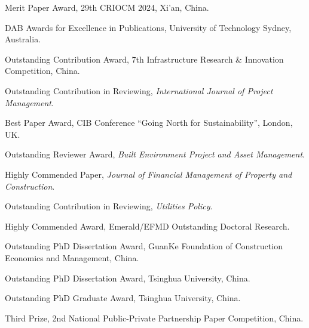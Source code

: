 \documentclass[11pt,a4paper]{report} %
\begin{document}
    \begin{tablist}

        \item[2024] \tab{}Merit Paper Award, 29th CRIOCM 2024, Xi'an, China.
        
        \item[2020] \tab{}DAB Awards for Excellence in Publications, University of Technology Sydney, Australia.
        
        \item[2020] \tab{}Outstanding Contribution Award, 7th Infrastructure Research \& Innovation Competition, China.
        
        \item[2016] \tab{}Outstanding Contribution in Reviewing, \textit{International Journal of Project Management}.
        
        \item[2015] \tab{}Best Paper Award, CIB Conference “Going North for Sustainability”, London, UK.
        
        \item[2015] \tab{}Outstanding Reviewer Award, \textit{Built Environment Project and Asset Management}.
        
        \item[2014] \tab{}Highly Commended Paper, \textit{Journal of Financial Management of Property and Construction}.
        
        \item[2014] \tab{}Outstanding Contribution in Reviewing, \textit{Utilities Policy}.
        
        \item[2010] \tab{}Highly Commended Award, Emerald/EFMD Outstanding Doctoral Research.
        
        \item[2010] \tab{}Outstanding PhD Dissertation Award, GuanKe Foundation of Construction Economics and Management, China.
        
        \item[2010] \tab{}Outstanding PhD Dissertation Award, Tsinghua University, China.
        
        \item[2010] \tab{}Outstanding PhD Graduate Award, Tsinghua University, China.
        
        \item[2010] \tab{}Third Prize, 2nd National Public-Private Partnership Paper Competition, China.
        

\end{tablist}
\end{document}
